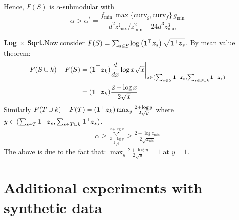 \documentclass{article}
\newcommand{\xhdr}[1]{\noindent\textbf{#1.}}
\begin{document}
 Hence, $F(S)$ is $\alpha$-submodular with
 $$\alpha> \alpha^* =  \frac{f_{\min} \, \max\{\text{curv}_{g},\text{curv}_{f}\} \, g_{\min}}{ d^2 z_{\max} ^2 / z_{\min} ^2 + 24d^3 z^3 _{\max} }    $$

\xhdr{Log $\times$ Sqrt}Now consider $F(S) = \sum_{s\in S} \log\left(\bm{1}^\top \bm{z}_s\right) \sqrt{\bm{1}^\top \bm{z}_s}$. By mean value theorem:
\begin{align}
    F(S\cup k)-F(S) & =  (\bm{1}^{\top} \bm{z}_k) \frac{d}{dx} \log x   \sqrt{x} \bigg|_{x \in (\sum_{s\in S}\bm{1}^\top \bm{z}_s, \sum_{s\in S\cup k}\bm{1}^\top \bm{z}_s)} \nonumber\\
    & = (\bm{1}^{\top} \bm{z}_k) \frac{2+\log x}{2\sqrt{x}}
\end{align}
Similarly ${F(T\cup k)-F(T)} = (\bm{1}^{\top} \bm{z}_k)  \max_{y} \frac{2+\log y}{2\sqrt{y}} $ where $y   \in (\sum_{s\in T}\bm{1}^\top \bm{z}_s, \sum_{s\in T\cup k}\bm{1}^\top \bm{z}_s)$.
\begin{align}
    \alpha \ge  \frac{\frac{2+\log x}{2\sqrt{x}}}{ \frac{2+\log y}{2\sqrt{y}}   } \ge \frac{2+\log z_{\min}}{2\sqrt{z_{\min}}}
\end{align}
The above is due to the fact that: $\max_{y} \frac{2+\log y}{2\sqrt{y}} = 1$ at $y=1$. 

 
\section{{Additional experiments with synthetic data}}
\end{document}
